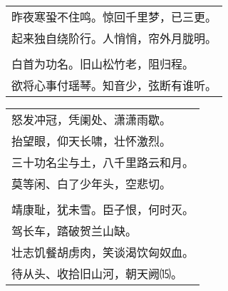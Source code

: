 \nopagebreak%
\nopagebreak%
\noindent\begin{minipage}{\linewidth}
  \vskip-3pt\begin{table}[H]
    \centering
    \begin{tabular}{@{}l@{}}
昨夜寒蛩不住鸣。惊回千里梦，已三更。\\
起来独自绕阶行。人悄悄，帘外月胧明。\\
\\
白首为功名。旧山松竹老，阻归程。\\
欲将心事付瑶琴。知音少，弦断有谁听。
    \end{tabular}
  \end{table}
\end{minipage}
\vspace{1cm}


\nopagebreak%
\nopagebreak%
\noindent\begin{minipage}{\linewidth}
  \vskip-3pt\begin{table}[H]
    \centering
    \begin{tabular}{@{}l@{}}
怒发冲冠，凭阑处、潇潇雨歇。\\
抬望眼，仰天长啸，壮怀激烈。\\
三十功名尘与土，八千里路云和月。\\
莫等闲、白了少年头，空悲切。\\
\\
靖康耻，犹未雪。臣子恨，何时灭。\\
驾长车，踏破贺兰山缺。\\
壮志饥餐胡虏肉，笑谈渴饮匈奴血。\\
待从头、收拾旧山河，朝天阙⒂。
    \end{tabular}
  \end{table}
\end{minipage}
\vspace{1cm}


